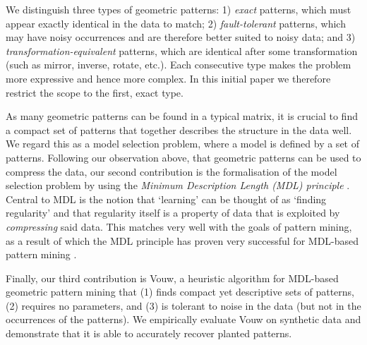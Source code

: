 \documentclass{llncs}
\begin{document}
We distinguish three types of geometric patterns: 1) \emph{exact} patterns, which must appear exactly identical in the data to match; 2) \emph{fault-tolerant} patterns, which may have noisy occurrences and are therefore better suited to noisy data; and 3) \emph{transformation-equivalent} patterns, which are identical after some transformation (such as mirror, inverse, rotate, etc.). Each consecutive type makes the problem more expressive and hence more complex. In this initial paper we therefore restrict the scope to the first, exact type.

As many geometric patterns can be found in a typical matrix, it is crucial to find a compact set of patterns that together describes the structure in the data well. We regard this as a model selection problem, where a model is defined by a set of patterns. Following our observation above, that geometric patterns can be used to compress the data, our second contribution is the formalisation of the model selection problem by using the \emph{Minimum Description Length (MDL) principle} \cite{rissanenmdl,grunwaldmdl}. Central to MDL is the notion that `learning' can be thought of as `finding regularity' and that regularity itself is a property of data that is exploited by \emph{compressing} said data. This matches very well with the goals of pattern mining, as a result of which the MDL principle has proven very successful for MDL-based pattern mining \cite{krimp,classy}.

Finally, our third contribution is Vouw, a heuristic algorithm for MDL-based geometric pattern mining that (1) finds compact yet descriptive sets of patterns, (2) requires no parameters, and (3) is tolerant to noise in the data (but not in the occurrences of the patterns). We empirically evaluate Vouw on synthetic data and demonstrate that it is able to accurately recover planted patterns.
\end{document}
